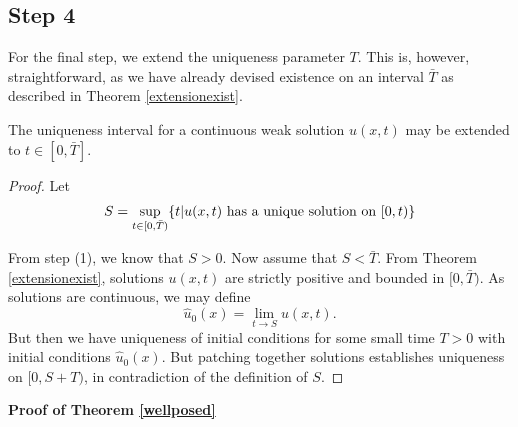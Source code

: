 \subsection*{Step 4} For the final step, we extend the uniqueness parameter $T$.  This is, however, straightforward, as we have already devised existence on an interval $\bar T$ as described in Theorem \ref{extensionexist}.

\begin{theorem}
The uniqueness interval for a continuous weak solution $u(x,t)$ may be extended to $t\in [0,\bar T]$.
\end{theorem}
\begin{proof}
Let
\begin{equation}
S = \sup_{t \in [0,\bar T)}\{t|u(x,t) \hbox{ has a unique solution on }[0,t)\}  \end{equation}
 
From step (1), we know that $S>0$.  Now assume that $S<\bar T$.  From Theorem \ref{extensionexist}, solutions $u(x,t)$ are strictly positive and bounded in $[0,\bar T)$.  As solutions are continuous, we may define
\begin{equation}
\hat u_0(x) = \lim_{t\rightarrow S}u(x,t).
\end{equation}
But then we have uniqueness of initial conditions for some small time $T>0$ with initial conditions $\hat u_0(x)$.  But patching together solutions  establishes uniqueness on $[0,S+T)$, in contradiction of the definition of $S$.
\end{proof}

\hspace{-20pt}\textbf{Proof of Theorem \ref{wellposed}}

